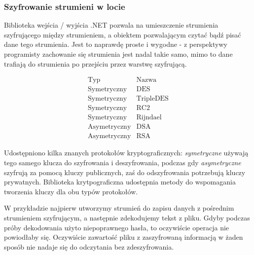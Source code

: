 \subsubsection{Szyfrowanie strumieni w locie}

Biblioteka wejścia / wyjścia .NET pozwala na umieszczenie strumienia szyfrującego 
między strumieniem, a obiektem pozwalającym czytać bądź pisać dane tego strumienia. 
Jest to naprawdę proste i wygodne - z perspektywy programisty zachowanie się strumienia
jest nadal takie samo, mimo to dane trafiają do strumienia po przejściu przez warstwę szyfrującą.

\begin{center}
$$\begin{array}{ll}
\mbox{Typ} & \mbox{Nazwa}  \\
\hline 
\mbox{Symetryczny} & \mbox{DES} \\
\mbox{Symetryczny} & \mbox{TripleDES} \\
\mbox{Symetryczny} & \mbox{RC2} \\
\mbox{Symetryczny} & \mbox{Rijndael} \\
\mbox{Asymetryczny} & \mbox{DSA} \\
\mbox{Asymetryczny} & \mbox{RSA} 
\end{array}$$
\end{center}

Udostępniono kilka znanych protokołów kryptograficznych: {\em symetryczne} używają tego samego
klucza do szyfrowania i deszyfrowania, podczas gdy {\em asymetryczne} szyfrują za pomocą kluczy
publicznych, zaś do odszyfrowania potrzebują kluczy prywatnych. Biblioteka krytpograficzna
udostępnia metody do wspomagania tworzenia kluczy dla obu typów protokołów.

W przykładzie najpierw utworzymy strumień do zapisu danych z pośrednim strumieniem 
szyfrującym, a następnie zdekodujemy tekst z pliku. Gdyby podczas próby dekodowania użyto
niepoprawnego hasła, to oczywiście operacja nie powiodłaby się. Oczywiście zawartość pliku z
zaszyfrowaną informacją w żaden sposób nie nadaje się do odczytania bez zdeszyfrowania.

